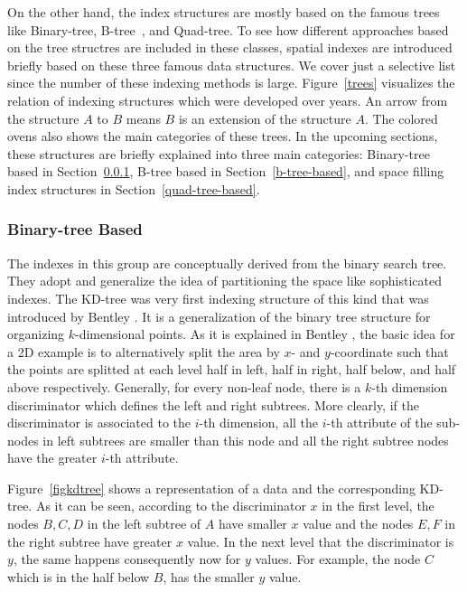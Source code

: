 \documentclass[a4paper,12pt]{article}
\begin{document}
On the other hand, the index structures are mostly based on the famous trees like Binary-tree, B-tree~\cite{btree}, and Quad-tree. 
To see how different approaches based on the tree structres are included in these classes, 
spatial indexes are introduced briefly based on these three famous data structures. We cover just a selective list since the number of these indexing methods
is large. Figure~\ref{trees} visualizes the relation of indexing structures which were developed over years. An arrow from the structure $A$ to $B$ means $B$ is an extension of the structure $A$. The colored ovens also shows the main categories of these
trees. In the upcoming sections, these structures are briefly explained into three main categories:
Binary-tree based in Section~\ref{binary-tree-based}, 
B-tree based in Section~\ref{b-tree-based}, 
and space filling index structures in Section~\ref{quad-tree-based}.

\subsubsection{Binary-tree Based}
\label{binary-tree-based}
The indexes in this group are conceptually derived from the binary search tree. 
They adopt and generalize the idea of partitioning the space like sophisticated indexes. 
The KD-tree was very first indexing structure of this kind that was introduced by Bentley \cite{bently1975}. 
It is a generalization of the binary tree structure for organizing $k$-dimensional points. As it is explained in Bentley \cite{bently1975}, the basic idea for a 2D example is to alternatively split the area by $x$- and $y$-coordinate such that the points are splitted at each level half in left, half in right, half below, and half above respectively. Generally, for every non-leaf node, there is a $k$-th dimension discriminator which defines the left and right subtrees. More clearly, if the discriminator is associated to the $i$-th dimension, all the $i$-th attribute of the sub-nodes in left subtrees are smaller than this node and all the right subtree nodes have the greater $i$-th attribute. 

Figure~\ref{figkdtree} shows a representation of a data and the corresponding KD-tree. As it can be seen, according to the discriminator $x$ in the first level, the nodes $B, C, D$ in the left subtree of $A$ have smaller $x$ value and the nodes $E, F$ in the right subtree have greater $x$ value. In the next level that the discriminator is $y$, the same happens consequently now for $y$ values. For example, the node $C$ which is in the half below $B$, has the smaller $y$ value.
\end{document}

